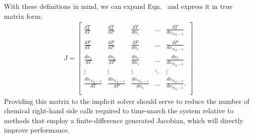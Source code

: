With these definitions in mind, we can expand Eqn.~ and express
it in true matrix form:
\begin{align}
J = \begin{bmatrix} \frac{d\dot{T}}{dT} & \frac{d\dot{T}}{dP} & \frac{d\dot{T}}{dn_{1}} & \hdots & \frac{d\dot{T}}{dn_{N_{sp}-1}} \\
                    \frac{d\dot{P}}{dT} & \frac{d\dot{P}}{dP} & \frac{d\dot{P}}{dn_{1}} & \hdots & \frac{d\dot{P}}{dn_{N_{sp}-1}} \\
		    \frac{d\dot{n}_{1}}{dT} & \frac{d\dot{n}_{1}}{dP} & \frac{d\dot{n}_{1}}{dn_{1}} & \hdots & \frac{d\dot{n}_{1}}{dn_{N_{sp}-1}} \\
		    \vdots & \vdots & \vdots & \ddots & \vdots \\
		    \frac{d\dot{n}_{N_{sp}-1}}{dT} & \frac{d\dot{n}_{N_{sp}-1}}{dP} & \frac{d\dot{n}_{N_{sp}-1}}{dn_{1}} & \hdots & \frac{d\dot{n}_{N_{sp}-1}}{dn_{N_{sp}-1}}. \\
    \end{bmatrix}
\end{align}
Providing this matrix to the implicit solver should serve to reduce the
number of chemical right-hand side calls required to time-march the
system relative to methods that employ a finite-difference generated
Jacobian, which will directly improve performance.

